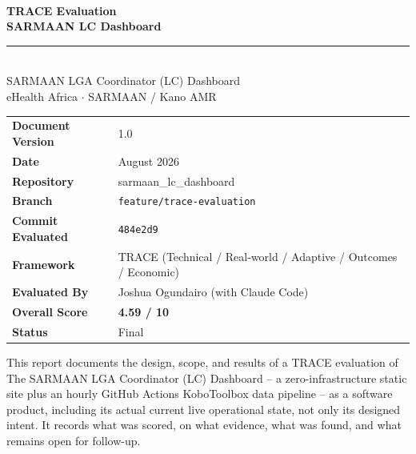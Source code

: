\documentclass[12pt, a4paper]{article}
\begin{document}
\begin{titlepage}
  \pagecolor{ehaBlue}\color{white}
  \vspace*{1.8cm}

  {\fontsize{10}{12}\selectfont\MakeUppercase{}}\\[0.5em]
  {\fontsize{26}{32}\selectfont\bfseries TRACE Evaluation\\[0.3em]
   SARMAAN LC Dashboard}\\[1.2em]
  \textcolor{ehaAccent}{\rule{6cm}{2pt}}\\[1.2em]

  {\large SARMAAN LGA Coordinator (LC) Dashboard}\\[0.4em]
  {\normalsize eHealth Africa $\cdot$ SARMAAN / Kano AMR}\\[2.5cm]

  \begin{tabular}{@{}ll}
    \textbf{Document Version}  & 1.0 \\[0.4em]
    \textbf{Date}              & August 2026 \\[0.4em]
    \textbf{Repository}        & sarmaan\_lc\_dashboard \\[0.4em]
    \textbf{Branch}            & \texttt{feature/trace-evaluation} \\[0.4em]
    \textbf{Commit Evaluated}  & \texttt{484e2d9} \\[0.4em]
    \textbf{Framework}         & TRACE (Technical / Real-world / Adaptive / Outcomes / Economic) \\[0.4em]
    \textbf{Evaluated By}      & Joshua Ogundairo (with Claude Code) \\[0.4em]
    \textbf{Overall Score}     & \textbf{4.59 / 10} \\[0.4em]
    \textbf{Status}            & Final \\
  \end{tabular}

  \vfill
  {\small\textcolor{white!70!ehaBlue}
    {This report documents the design, scope, and results of a TRACE
     evaluation of The SARMAAN LGA Coordinator (LC) Dashboard -- a zero-infrastructure static site plus an hourly GitHub Actions KoboToolbox data pipeline -- as a software product, including its actual current live operational state, not only its designed intent. It
     records what was scored, on what evidence, what was found, and what
     remains open for follow-up.}}
\end{titlepage}
\pagecolor{white}\color{black}
\end{document}
